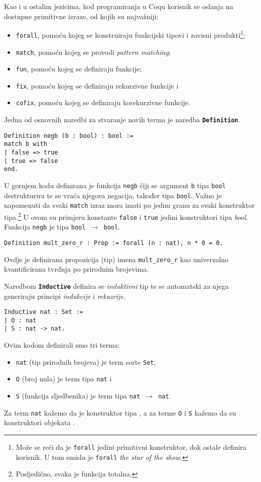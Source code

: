 Kao i u ostalim jezicima, kod programiranja u Coqu korisnik se oslanja na dostupne primitivne izraze,
od kojih su najvažniji:
\begin{itemize}
\item \texttt{forall}, pomoću kojeg se konstruiraju funkcijski tipovi i zavisni produkti\footnote{Može se reći da je \texttt{forall} jedini primitivni konstruktor, dok ostale definira korisnik. U tom smislu je \texttt{forall} \textit{the star of the show.}};
\item \texttt{match}, pomoću kojeg se provodi \textit{pattern matching};
\item \texttt{fun}, pomoću kojeg se definiraju funkcije;
\item \texttt{fix}, pomoću kojeg se definiraju rekurzivne funkcije i
\item \texttt{cofix}, pomoću kojeg se definiraju korekurzivne funkcije.
\end{itemize}

Jedna od osnovnih naredbi za stvaranje novih terma je naredba \texttt{\textbf{Definition}}.
\begin{verbatim}
Definition negb (b : bool) : bool :=
match b with
| false => true
| true => false
end.
\end{verbatim}
\noindent U gornjem kodu definirana je funkcija \texttt{negb} čiji se argument \texttt{b} tipa \texttt{bool} destrukturira te se vraća njegova negacija, također tipa \texttt{bool}.
Važno je napomenuti da svaki \texttt{match} izraz mora imati po jednu granu za svaki konstruktor tipa.\footnote{Posljedično, svaka je funkcija totalna.}
U ovom su primjeru konstante \texttt{false} i \texttt{true} jedini konstruktori tipa \textit{bool}.
Funkcija \texttt{negb} je tipa \texttt{bool \(\rightarrow\) bool}.
\begin{verbatim}
Definition mult_zero_r : Prop := forall (n : nat), n * 0 = 0.
\end{verbatim}
Ovdje je definirana propozicija (tip) imena \texttt{mult\_zero\_r} kao univerzalno kvantificirana tvrdnja po prirodnim brojevima.

Naredbom \texttt{\textbf{Inductive}} definira se \textit{induktivni} tip te se automatski za njega generiraju principi \textit{indukcije} i \textit{rekuzrije}.
\begin{verbatim}
Inductive nat : Set :=
| O : nat
| S : nat -> nat.
\end{verbatim}
Ovim kodom definirali smo tri terma:
\begin{itemize}
\item \texttt{nat} (tip prirodnih brojeva) je term sorte \texttt{Set},
\item \texttt{O} (broj nula) je term tipa \texttt{nat} i
\item \texttt{S} (funkcija sljedbenika) je term tipa \texttt{nat \(\rightarrow\) nat}.
\end{itemize}
\noindent Za term \texttt{nat} kažemo da je konstruktor tipa , a za terme \texttt{O} i \texttt{S} kažemo da su konstruktori objekata .

